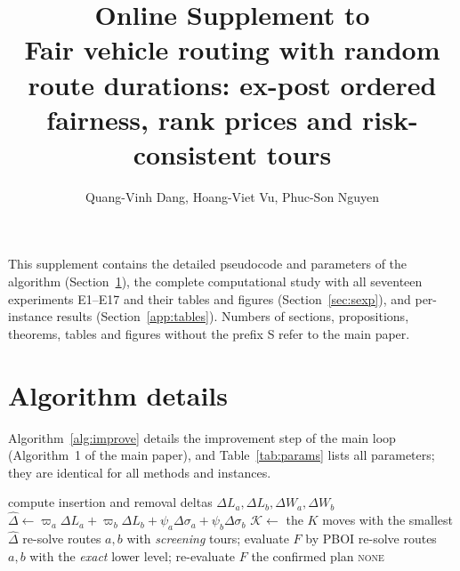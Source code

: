 \documentclass[11pt]{article}
\title{Online Supplement to\\[3pt]
\textbf{Fair vehicle routing with random route durations: ex-post ordered
fairness, rank prices and risk-consistent tours}}
\author{Quang-Vinh Dang, Hoang-Viet Vu, Phuc-Son Nguyen}
\date{}
\begin{document}
\maketitle
\noindent This supplement contains the detailed pseudocode and parameters of
the algorithm (Section~\ref{sec:salg}), the complete computational study with
all seventeen experiments E1--E17 and their tables and figures
(Section~\ref{sec:sexp}), and per-instance results
(Section~\ref{app:tables}). Numbers of sections, propositions, theorems,
tables and figures without the prefix S refer to the main paper.

\section{Algorithm details}\label{sec:salg}
Algorithm~\ref{alg:improve} details the improvement step of the main loop
(Algorithm~1 of the main paper), and Table~\ref{tab:params} lists all
parameters; they are identical for all methods and instances.

\begin{algorithm}[t]
\caption{\textsc{ImproveStep}$(P,\varpi,\psi)$: screen, evaluate, confirm}\label{alg:improve}
\begin{algorithmic}[1]
  \State compute insertion and removal deltas $\Delta L_a,\Delta L_b,\Delta W_a,\Delta W_b$
    \State $\hat\Delta\gets\varpi_a\Delta L_a+\varpi_b\Delta L_b+\psi_a\Delta\sigma_a+\psi_b\Delta\sigma_b$ 
  \EndIf
\EndFor
\State $\mathcal K\gets$ the $K$ moves with the smallest $\hat\Delta$
 \State re-solve routes $a,b$ with \emph{screening} tours; evaluate $F$ by PBOI \EndFor
{}
  \State re-solve routes $a,b$ with the \emph{exact} lower level; re-evaluate $F$
   \Return the confirmed plan \EndIf
\EndFor
\State \Return \textsc{none}
\end{algorithmic}
\end{algorithm}
\end{document}
